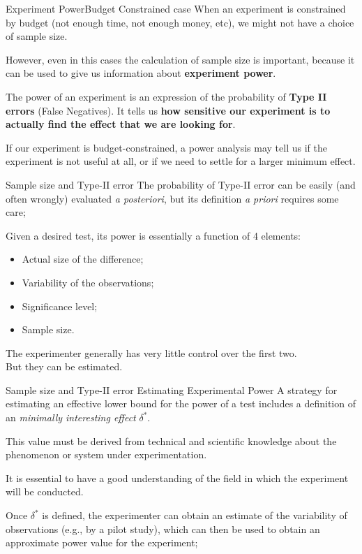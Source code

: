 \begin{frame}{Experiment Power}{Budget Constrained case}
  When an experiment is constrained by budget (not enough time,
  not enough money, etc), we might not have a choice of sample size.\bigskip

  However, even in this cases the calculation of sample size is important,
  because it can be used to give us information about {\bf experiment power}.\bigskip

  The power of an experiment is an expression of the probability of {\bf Type II errors} (False Negatives). It tells us {\bf how sensitive our experiment is to actually find the effect that we are looking for}.\bigskip

  If our experiment is budget-constrained, a power analysis may tell us if the experiment is not useful at all, or if we need to settle for a larger minimum effect.
\end{frame}

\begin{frame}{Sample size and Type-II error}
  The probability of Type-II error can be easily (and often wrongly) evaluated \textit{a posteriori}, but its definition \textit{a priori} requires some care; \bigskip

  Given a desired test, its power is essentially a function of 4 elements:
  \begin{itemize}
    \item Actual size of the difference;
  	\item Variability of the observations;
  	\item Significance level;
  	\item Sample size.
  \end{itemize}\bigskip

  The experimenter generally has very little control over the first two.\\
  But they can be estimated.
\end{frame}

\begin{frame}{Sample size and Type-II error}
  {Estimating Experimental Power}
  A strategy for estimating an effective lower bound for the power of a test includes a definition of an \textit{minimally interesting effect} $\delta^*$.
  \bigskip

  This value must be derived from technical and scientific knowledge about the phenomenon or system under experimentation.
  \bigskip

  \begin{block}{}
  \centering It is essential to have a good understanding of the field in which the experiment will be conducted.
  \end{block}\bigskip

  Once $\delta^*$ is defined, the experimenter can obtain an estimate of the variability of observations (e.g., by a pilot study), which can then be used to obtain an approximate power value for the experiment;
\end{frame}

